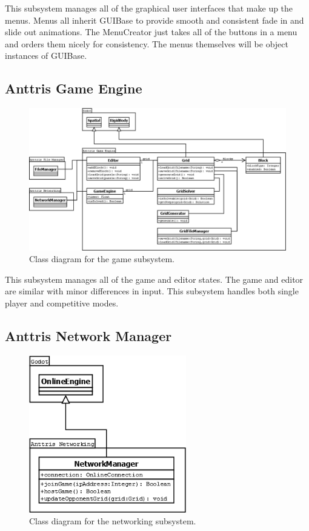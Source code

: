 \documentclass[12pt]{article}
\begin{document}
This subsystem manages all of the graphical user interfaces that make up the menus. Menus all inherit GUIBase to provide smooth and consistent fade in and slide out animations. The MenuCreator just takes all of the buttons in a menu and orders them nicely for consistency. The menus themselves will be object instances of GUIBase.

\subsection{Anttris Game Engine} %
    \begin{figure}[H]
        \centering
        \includegraphics[width=6in]{Anttris_GameClass.png}
        \caption{Class diagram for the game subsystem.}
    \end{figure}

This subsystem manages all of the game and editor states. The game and editor are similar with minor differences in input. This subsystem handles both single player and competitive modes.

\subsection{Anttris Network Manager} %
    \begin{figure}[H]
        \centering
        \includegraphics[width=2.7in]{Anttris_NetworkingClass.png}
        \caption{Class diagram for the networking subsystem.}
    \end{figure}
\end{document}
